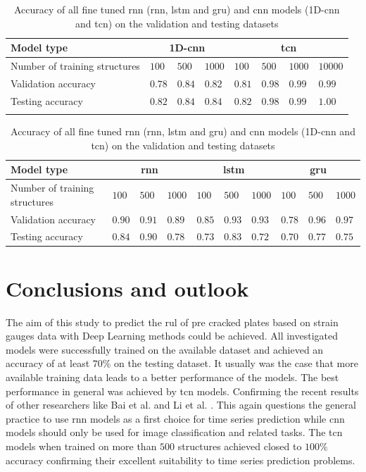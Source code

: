 \documentclass[conference]{IEEEtran}
\begin{document}
\begin{table}[htp]
	\centering
	\caption{Accuracy of all fine tuned \gls{rnn} (\gls{rnn}, \gls{lstm} and \gls{gru}) and \gls{cnn} models (1D-\gls{cnn} and \gls{tcn}) on the validation and testing datasets}
	\label{tab:accuracy_testing_rnn_cnn}
	\setlength{\tabcolsep}{3pt} %
	\begin{tabular}{p{2.5cm}|lll|llll}
		Model type & \multicolumn{3}{c|}{1D-\gls{cnn}} & \multicolumn{4}{c}{\gls{tcn}} \\
		\hline
		Number of training structures & $ 100 $ & $ 500 $ & $ 1000 $ & $ 100 $ & $ 500 $ & $ 1000 $ & $ 10000 $ \\
		Validation accuracy & $ 0.78 $ & $ 0.84 $ & $ 0.82 $ & $ 0.81 $ & $ 0.98 $ & $ 0.99 $ & $ 0.99 $ \\
		Testing accuracy & $ 0.82 $ & $ 0.84 $ & $ 0.84 $ & $ 0.82 $ & $ 0.98 $ & $ 0.99 $ & $ 1.00 $ \\
		\multicolumn{8}{c}{}
	\end{tabular}

	\setlength{\tabcolsep}{2pt} %
	\begin{tabular}{p{2.5cm}|lll|lll|lll}
		Model type & \multicolumn{3}{c|}{\gls{rnn}} & \multicolumn{3}{c|}{\gls{lstm}} &  \multicolumn{3}{c}{\gls{gru}}\\
		\hline
		Number of training structures & $ 100 $ & $ 500 $ & $ 1000 $ & $ 100 $ & $ 500 $ & $ 1000 $ & $ 100 $ & $ 500 $ & $ 1000 $ \\
		Validation accuracy & $ 0.90 $ & $ 0.91 $ & $ 0.89 $ & $ 0.85 $ & $ 0.93 $ & $ 0.93 $ & $ 0.78 $ & $ 0.96 $ & $ 0.97 $ \\
		Testing accuracy & $ 0.84 $ & $ 0.90 $ & $ 0.78 $ & $ 0.73 $ & $ 0.83 $ & $ 0.72 $ & $ 0.70 $ & $ 0.77 $ & $ 0.75 $
	\end{tabular}

\end{table}

\section{Conclusions and outlook}
\label{sec:conclusions_outlook}

The aim of this study to predict the \gls{rul} of pre cracked plates based on strain gauges data with Deep Learning methods could be achieved. All investigated models were successfully trained on the available dataset and achieved an accuracy of at least $ 70 \% $ on the testing dataset. It usually was the case that more available training data leads to a better performance of the models. The best performance in general was achieved by \gls{tcn} models. Confirming the recent results of other researchers like Bai et al. \cite{Bai2018} and Li et al. \cite{Li2018}. This again questions the general practice to use \gls{rnn} models as a first choice for time series prediction while \gls{cnn} models should only be used for image classification and related tasks. The \gls{tcn} models when trained on more than $ 500 $ structures achieved closed to $ 100 \% $ accuracy confirming their excellent suitability to time series prediction problems.
\end{document}

